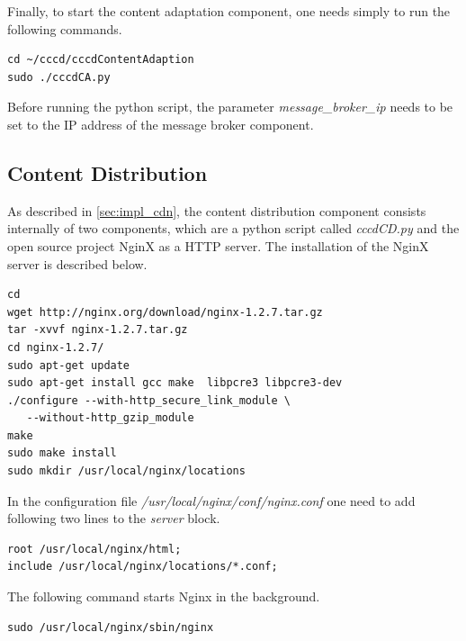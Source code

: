 Finally, to start the content adaptation component, one needs simply to run the following commands.

\begin{code}
\begin{verbatim}
cd ~/cccd/cccdContentAdaption
sudo ./cccdCA.py
\end{verbatim}
\end{code}

Before running the python script, the parameter \textit{message\_broker\_ip} needs to be set to the IP address of the message broker component.

\subsection{Content Distribution\label{sec:eval_te_cd}}
As described in \ref{sec:impl_cdn}, the content distribution component consists internally of two components, which are a python script called \textit{cccdCD.py} and the open source project NginX as a \ac{HTTP} server. The installation of the NginX server is described below.

\begin{code}
\begin{verbatim}
cd
wget http://nginx.org/download/nginx-1.2.7.tar.gz
tar -xvvf nginx-1.2.7.tar.gz 
cd nginx-1.2.7/
sudo apt-get update
sudo apt-get install gcc make  libpcre3 libpcre3-dev
./configure --with-http_secure_link_module \
   --without-http_gzip_module
make
sudo make install
sudo mkdir /usr/local/nginx/locations
\end{verbatim}
\end{code}

In the configuration file \textit{/usr/local/nginx/conf/nginx.conf} one need to add following two lines to the \textit{server} block.

\begin{code}
\begin{verbatim}
root /usr/local/nginx/html;
include /usr/local/nginx/locations/*.conf;
\end{verbatim}
\end{code}
 
The following command starts Nginx in the background.

\begin{code}
\begin{verbatim}
sudo /usr/local/nginx/sbin/nginx
\end{verbatim}
\end{code}

